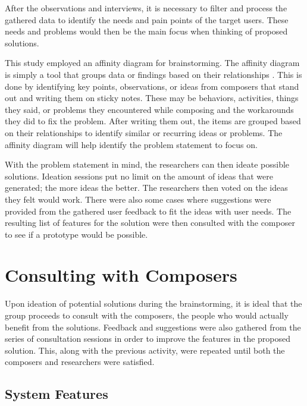 		After the observations and interviews, it is necessary to filter and process the gathered data to identify the needs and pain points of the target users. These needs and problems would then be the main focus when thinking of proposed solutions. 

		This study employed an affinity diagram for brainstorming. The affinity diagram is simply a tool that groups data or findings based on their relationships \citep{beyer1999contextual}. This is done by identifying key points, observations, or ideas from composers that stand out and writing them on sticky notes. These may be behaviors, activities, things they said, or problems they encountered while composing and the workarounds they did to fix the problem. After writing them out, the items are grouped based on their relationships to identify similar or recurring ideas or problems. The affinity diagram will help identify the problem statement to focus on.

		With the problem statement in mind, the researchers can then ideate possible solutions. Ideation sessions put no limit on the amount of ideas that were generated; the more ideas the better. The researchers then voted on the ideas they felt would work. There were also some cases where suggestions were provided from the gathered user feedback to fit the ideas with user needs. The resulting list of features for the solution were then consulted with the composer to see if a prototype would be possible.  

	\section{Consulting with Composers}

		Upon ideation of potential solutions during the brainstorming, it is ideal that the group proceeds to consult with the composers, the people who would actually benefit from the solutions. Feedback and suggestions were also gathered from the series of consultation sessions in order to improve the features in the proposed solution. This, along with the previous activity, were repeated until both the composers and researchers were satisfied.

		\subsection{System Features}

